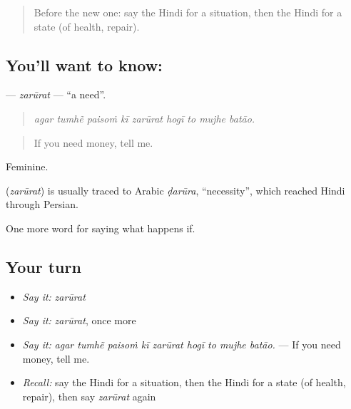 \label{lesson:HI-C377-zarurat}



\begin{quote}
Before the new one: say the Hindi for a situation, then the Hindi for a state (of health, repair).
\end{quote}

\subsection*{You'll want to know: }
\textbf{} — \emph{zarūrat} — \textquotedblleft{}a need\textquotedblright{}.

\begin{quote}
        
\end{quote}

\begin{quote}
\emph{agar tumhẽ paisoṁ kī zarūrat hogī to mujhe batāo.}
\end{quote}

\begin{quote}
If you need money, tell me.
\end{quote}

Feminine.

\begin{cousinweb}
\textbf{} (\emph{zarūrat}) is usually traced to Arabic \emph{ḍarūra}, \textquotedblleft{}necessity\textquotedblright{}, which reached Hindi through Persian.
\end{cousinweb}

\begin{grammarlens}[title={What you've built}]
One more word for saying what happens if.
\end{grammarlens}

\subsection*{Your turn}
\begin{itemize}
\raggedright
  \item \emph{Say it:} \emph{zarūrat}
  \item \emph{Say it:} \emph{zarūrat}, once more
  \item \emph{Say it:} \emph{agar tumhẽ paisoṁ kī zarūrat hogī to mujhe batāo.} — If you need money, tell me.
  \item \emph{Recall:} say the Hindi for a situation, then the Hindi for a state (of health, repair), then say \emph{zarūrat} again
\end{itemize}

